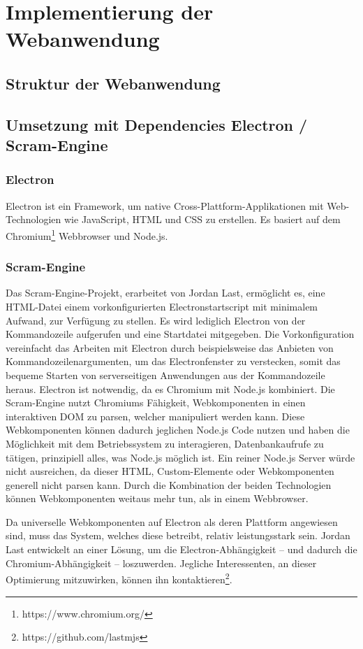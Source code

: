 \chapter{Implementierung der Webanwendung}

\section{Struktur der Webanwendung}

\section{Umsetzung mit Dependencies Electron / Scram-Engine}

\subsection{Electron}
Electron ist ein Framework, um native Cross-Plattform-Applikationen mit Web-Technologien wie JavaScript, HTML und CSS zu erstellen. Es basiert auf dem Chromium\footnote{https://www.chromium.org/} Webbrowser und Node.js.
\subsection{Scram-Engine}
\label{cha:scram-engine}
Das Scram-Engine-Projekt, erarbeitet von Jordan Last, ermöglicht es, eine HTML-Datei einem vorkonfigurierten Electronstartscript mit minimalem Aufwand, zur Verfügung zu stellen. Es wird lediglich Electron von der Kommandozeile aufgerufen und eine Startdatei mitgegeben. Die Vorkonfiguration vereinfacht das Arbeiten mit Electron durch beispielsweise das Anbieten von Kommandozeilenargumenten, um das Electronfenster zu verstecken, somit das bequeme Starten von serverseitigen Anwendungen aus der Kommandozeile heraus.
Electron ist notwendig, da es Chromium mit Node.js kombiniert. Die Scram-Engine nutzt Chromiums Fähigkeit, Webkomponenten in einen interaktiven DOM zu parsen, welcher manipuliert werden kann. Diese Webkomponenten können dadurch jeglichen Node.js Code nutzen und haben die Möglichkeit mit dem Betriebssystem zu interagieren, Datenbankaufrufe zu tätigen, prinzipiell alles, was Node.js möglich ist.
Ein reiner Node.js Server würde nicht ausreichen, da dieser HTML, Custom-Elemente oder Webkomponenten generell nicht parsen kann.
Durch die Kombination der beiden Technologien können Webkomponenten weitaus mehr tun, als in einem Webbrowser.

Da universelle Webkomponenten auf Electron als deren Plattform angewiesen sind, muss das System, welches diese betreibt, relativ leistungsstark sein. Jordan Last entwickelt an einer Lösung, um die Electron-Abhängigkeit -- und dadurch die Chromium-Abhängigkeit -- loszuwerden. Jegliche Interessenten, an dieser Optimierung mitzuwirken, können ihn kontaktieren\footnote{https://github.com/lastmjs}.

